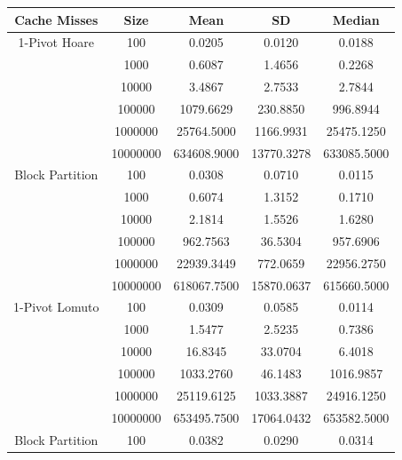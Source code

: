 \documentclass{article}
\begin{document}
\begin{center}
    \small
    \begin{tabular}{ |c c | c c c| }
        \hline
        Cache Misses    & Size     & Mean           & SD            & Median \\
        \hline
        1-Pivot Hoare   & 100      & 0.0205         & 0.0120        & 0.0188 \\
                        & 1000     & 0.6087         & 1.4656        & 0.2268 \\
                        & 10000    & 3.4867         & 2.7533        & 2.7844 \\
                        & 100000   & 1079.6629      & 230.8850      & 996.8944 \\
                        & 1000000  & 25764.5000     & 1166.9931     & 25475.1250 \\
                        & 10000000 & 634608.9000    & 13770.3278    & 633085.5000 \\
        Block Partition & 100      & 0.0308         & 0.0710        & 0.0115 \\
                        & 1000     & 0.6074         & 1.3152        & 0.1710 \\
                        & 10000    & 2.1814         & 1.5526        & 1.6280 \\
                        & 100000   & 962.7563       & 36.5304       & 957.6906 \\
                        & 1000000  & 22939.3449     & 772.0659      & 22956.2750 \\
                        & 10000000 & 618067.7500    & 15870.0637    & 615660.5000 \\
        \hline
        1-Pivot Lomuto  & 100      & 0.0309         & 0.0585        & 0.0114 \\
                        & 1000     & 1.5477         & 2.5235        & 0.7386 \\
                        & 10000    & 16.8345        & 33.0704       & 6.4018 \\
                        & 100000   & 1033.2760      & 46.1483       & 1016.9857 \\
                        & 1000000  & 25119.6125     & 1033.3887     & 24916.1250 \\
                        & 10000000 & 653495.7500    & 17064.0432    & 653582.5000 \\
        Block Partition & 100      & 0.0382         & 0.0290        & 0.0314 \\

\end{tabular}
\end{center}
\end{document}
